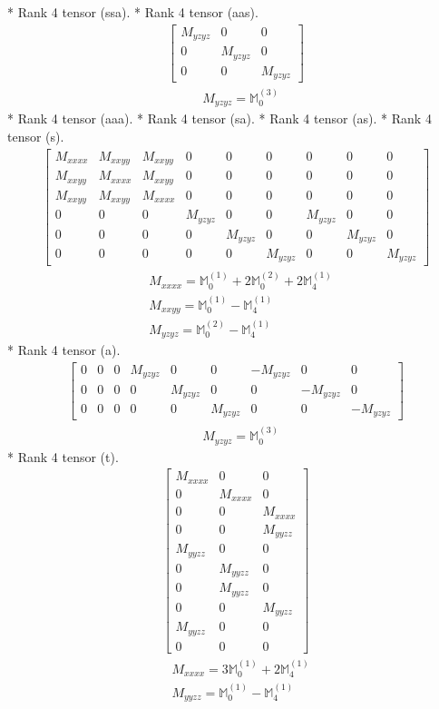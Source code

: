 \documentclass[fleqn,8pt,landscape]{jsarticle}
\begin{document}
* Rank 4 tensor (ssa).
* Rank 4 tensor (aas).
\begin{align*}
\begin{bmatrix} M_{yzyz} & 0 & 0 \\ 0 & M_{yzyz} & 0 \\ 0 & 0 & M_{yzyz} \end{bmatrix}
\end{align*}
\begin{align*}
& M_{yzyz} = \mathbb{M}_{0}^{(3)}
\end{align*}
* Rank 4 tensor (aaa).
* Rank 4 tensor (sa).
* Rank 4 tensor (as).
* Rank 4 tensor (s).
\begin{align*}
\begin{bmatrix} M_{xxxx} & M_{xxyy} & M_{xxyy} & 0 & 0 & 0 & 0 & 0 & 0 \\ M_{xxyy} & M_{xxxx} & M_{xxyy} & 0 & 0 & 0 & 0 & 0 & 0 \\ M_{xxyy} & M_{xxyy} & M_{xxxx} & 0 & 0 & 0 & 0 & 0 & 0 \\ 0 & 0 & 0 & M_{yzyz} & 0 & 0 & M_{yzyz} & 0 & 0 \\ 0 & 0 & 0 & 0 & M_{yzyz} & 0 & 0 & M_{yzyz} & 0 \\ 0 & 0 & 0 & 0 & 0 & M_{yzyz} & 0 & 0 & M_{yzyz} \end{bmatrix}
\end{align*}
\begin{align*}
& M_{xxxx} = \mathbb{M}_{0}^{(1)} + 2 \mathbb{M}_{0}^{(2)} + 2 \mathbb{M}_{4}^{(1)} \\
& M_{xxyy} = \mathbb{M}_{0}^{(1)} - \mathbb{M}_{4}^{(1)} \\
& M_{yzyz} = \mathbb{M}_{0}^{(2)} - \mathbb{M}_{4}^{(1)}
\end{align*}
* Rank 4 tensor (a).
\begin{align*}
\begin{bmatrix} 0 & 0 & 0 & M_{yzyz} & 0 & 0 & - M_{yzyz} & 0 & 0 \\ 0 & 0 & 0 & 0 & M_{yzyz} & 0 & 0 & - M_{yzyz} & 0 \\ 0 & 0 & 0 & 0 & 0 & M_{yzyz} & 0 & 0 & - M_{yzyz} \end{bmatrix}
\end{align*}
\begin{align*}
& M_{yzyz} = \mathbb{M}_{0}^{(3)}
\end{align*}
* Rank 4 tensor (t).
\begin{align*}
\begin{bmatrix} M_{xxxx} & 0 & 0 \\ 0 & M_{xxxx} & 0 \\ 0 & 0 & M_{xxxx} \\ 0 & 0 & M_{yyzz} \\ M_{yyzz} & 0 & 0 \\ 0 & M_{yyzz} & 0 \\ 0 & M_{yyzz} & 0 \\ 0 & 0 & M_{yyzz} \\ M_{yyzz} & 0 & 0 \\ 0 & 0 & 0 \end{bmatrix}
\end{align*}
\begin{align*}
& M_{xxxx} = 3 \mathbb{M}_{0}^{(1)} + 2 \mathbb{M}_{4}^{(1)} \\
& M_{yyzz} = \mathbb{M}_{0}^{(1)} - \mathbb{M}_{4}^{(1)}
\end{align*}
\end{document}
